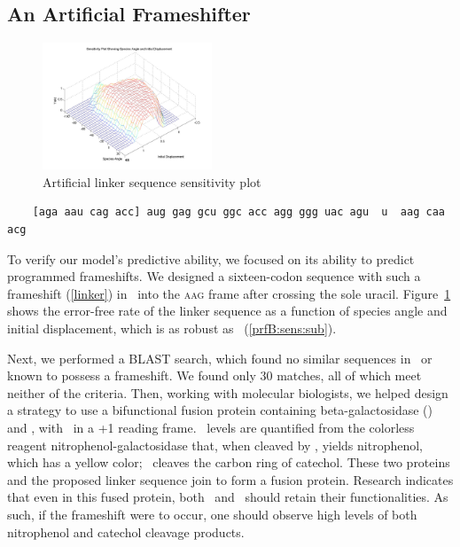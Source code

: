 \documentclass[12pt]{article}
\begin{document}
\subsection{An Artificial Frameshifter}
\begin{figure}
  \centering
  \caption{Artificial linker sequence sensitivity plot}
  \label{linker:sens}
  \includegraphics[width=0.45\textwidth]{linker/sensitivity}
\end{figure}

\begin{cfigure}
  \caption{Artificial linker sequence with a 12-base leader sequence
    in brackets}
  \label{linker}
  \begin{verbatim}
    [aga aau cag acc] aug gag gcu ggc acc agg ggg uac agu  u  aag caa acg
  \end{verbatim}
\end{cfigure}

To verify our model's predictive ability, we focused on its ability to
predict programmed frameshifts. We designed a sixteen-codon sequence
with such a frameshift (\autoref{linker}) in \ecoli\ into
the \textsc{aag} frame after crossing the sole uracil.  Figure~\ref{linker:sens}
shows the error-free rate of the linker sequence as a function of species
angle and initial displacement, which is as robust as \prfB\ (\autoref{prfB:sens:sub}).

Next, we performed a BLAST search, which found no similar sequences in 
\ecoli\ or known to possess a frameshift. We found only 30 matches, all 
of which meet neither of the criteria. Then, working with molecular 
biologists, we helped design a strategy to use a bifunctional fusion 
protein containing beta-galactosidase (\bgals) and \xylE, with \xylE\ in 
a +1 reading frame. \bgals\ levels are quantified from the colorless 
reagent nitrophenol-galactosidase that, when cleaved by \bgals, yields 
nitrophenol, which has a yellow color; \xylE\ cleaves the carbon ring 
of catechol.  These two proteins and the proposed linker sequence join 
to form a fusion protein.  Research indicates that even in this fused 
protein, both \bgals\ and \xylE\ should retain their functionalities.
As such, if the frameshift were to occur, one should observe high 
levels of both nitrophenol and catechol cleavage products.
\end{document}
